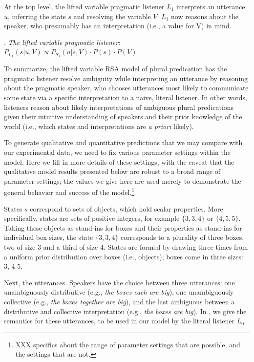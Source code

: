 \documentclass[linguex]{sp}
\begin{document}
At the top level, the lifted variable pragmatic listener $L_{1}$ interprets an utterance $u$, inferring the state $s$ and resolving the variable $V$. $L_{1}$ now reasons about the speaker, who presumably has an interpretation (i.e., a value for V) in mind.

\ex. \emph{The lifted variable pragmatic listener}:\\
$P_{L_{1}}(s|u,V) \propto P_{S_{1}}(u|s,V) \cdot P(s) \cdot P(V)$

To summarize, the lifted variable RSA model of plural predication has the pragmatic listener resolve ambiguity while interpreting an utterance by reasoning about the pragmatic speaker, who chooses utterances most likely to communicate some state via a specific interpretation to a naive, literal listener.  In other words, listeners reason about likely interpretations of ambiguous plural predications given their intuitive understanding of speakers and their prior knowledge of the world (i.e., which states and interpretations are \emph{a priori} likely).

To generate qualitative and quantitative predictions that we may compare with our experimental data, we need to fix various parameter settings within the model. Here we fill in more details of these settings, with the caveat that the qualitative model results presented below are robust to a broad range of parameter settings; the values we give here are used merely to demonstrate the general behavior and success of the model.\footnote{XXX specifics about the range of parameter settings that are possible, and the settings that are not.}

 States $s$ correspond to sets of objects, which hold scalar properties. More specifically, states are sets of positive integers, for example $\{3, 3, 4\}$ or $\{4, 5, 5\}$. Taking these objects as stand-ins for boxes and their properties as stand-ins for individual box sizes, the state $\{3, 3, 4\}$ corresponds to a plurality of three boxes, two of size 3 and a third of size 4. States are formed by drawing three times from a uniform prior distribution over boxes (i.e., objects); boxes come in three sizes: 3, 4 5.
 
 Next, the utterances. Speakers have the choice between three utterances: one {unambiguously distributive} (e.g., \emph{the boxes each are big}), one {unambiguously collective} (e.g., \emph{the boxes together are big}), and the last {ambiguous} between a distributive and collective interpretation (e.g., \emph{the boxes are big}). In \Next, we give the semantics for these utterances, to be used in our model by the literal listener $L_{0}$.
 
\end{document}
